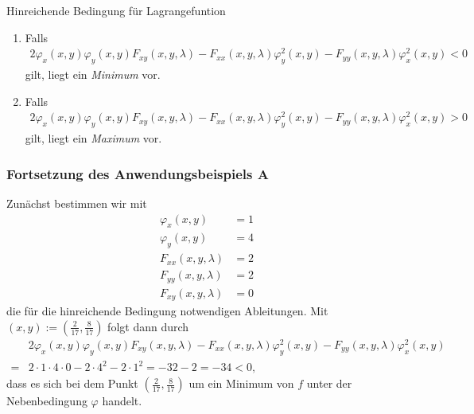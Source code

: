 \begin{mybox}{Hinreichende Bedingung für Lagrangefuntion}
\renewcommand{\labelenumi}{\theenumi.}
\begin{enumerate}
\item
Falls
\begin{align*}
2 \varphi_x(x,y)\varphi_y(x,y) F_{xy}(x,y,\lambda)
-F_{xx}(x,y,\lambda) \varphi_y^2(x,y) 
- F_{yy}(x,y,\lambda)\varphi_x^2(x,y) < 0
\end{align*}
gilt, liegt ein \textit{Minimum} vor.
\item
Falls
\begin{align*}
2 \varphi_x(x,y)\varphi_y(x,y) F_{xy}(x,y,\lambda)
-F_{xx}(x,y,\lambda) \varphi_y^2(x,y) 
- F_{yy}(x,y,\lambda)\varphi_x^2(x,y) > 0
\end{align*}
gilt, liegt ein \textit{Maximum} vor.
\end{enumerate}
\end{mybox}

\subsubsection*{Fortsetzung des Anwendungsbeispiels A}
Zunächst bestimmen wir mit
\begin{align*}
\varphi_x(x,y) &= 1 \\
\varphi_y(x,y) &= 4\\
F_{xx}(x,y,\lambda) &= 2 \\
F_{yy}(x,y,\lambda) &= 2\\
F_{xy}(x,y,\lambda) &= 0
\end{align*}
die für die hinreichende Bedingung notwendigen Ableitungen.
Mit $(x,y) :=  \left( \frac{2}{17}, \frac{8}{17} \right)$ folgt dann durch
\begin{align*}
&2 \varphi_x(x,y)\varphi_y(x,y) F_{xy}(x,y,\lambda)
-F_{xx}(x,y,\lambda) \varphi_y^2(x,y) 
- F_{yy}(x,y,\lambda)\varphi_x^2(x,y)\\
=
&2 \cdot 1 \cdot 4 \cdot 0 - 2 \cdot 4^2 - 2 \cdot 1^2 
=
- 32 - 2 = -34 < 0,
\end{align*}
dass es sich bei dem Punkt $\left( \frac{2}{17}, \frac{8}{17} \right)$ um ein Minimum von $f$ unter der Nebenbedingung $\varphi$ handelt.\\
\\

